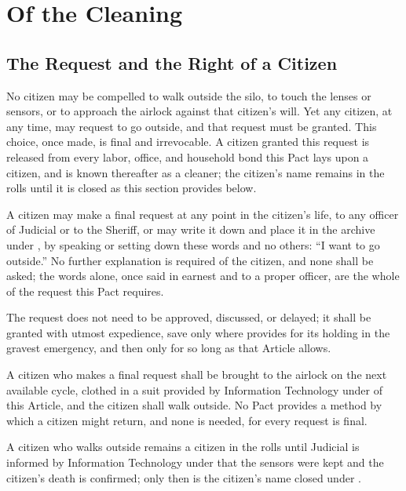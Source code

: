 \chapter{Of the Cleaning}
\label{art:cleaning}


\section{The Request and the Right of a Citizen}
\label{sec:cleaning:request-and-the-right-of-a-citizen}

No citizen may be compelled to walk outside the silo, to touch the lenses or sensors, or to approach the airlock against that citizen's will. Yet any citizen, at any time, may request to go outside, and that request must be granted. This choice, once made, is final and irrevocable. A citizen granted this request is released from every labor, office, and household bond this Pact lays upon a citizen, and is known thereafter as a cleaner; the citizen's name remains in the rolls until it is closed as this section provides below.

\begin{clauses}
\item A citizen may make a final request at any point in the citizen's life, to any officer of Judicial or to the Sheriff, or may write it down and place it in the archive under , by speaking or setting down these words and no others: ``I want to go outside.'' No further explanation is required of the citizen, and none shall be asked; the words alone, once said in earnest and to a proper officer, are the whole of the request this Pact requires.
\item The request does not need to be approved, discussed, or delayed; it shall be granted with utmost expedience, save only where  provides for its holding in the gravest emergency, and then only for so long as that Article allows.
\item A citizen who makes a final request shall be brought to the airlock on the next available cycle, clothed in a suit provided by Information Technology under  of this Article, and the citizen shall walk outside. No Pact provides a method by which a citizen might return, and none is needed, for every request is final.
\item A citizen who walks outside remains a citizen in the rolls until Judicial is informed by Information Technology under  that the sensors were kept and the citizen's death is confirmed; only then is the citizen's name closed under .
\end{clauses}


